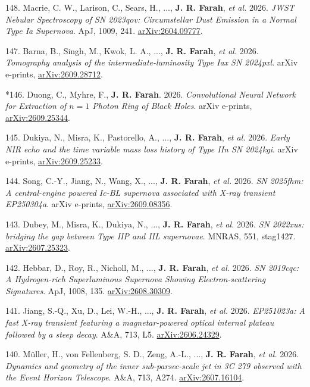 \documentclass[margin,line]{res}
\newcommand{\apj}{ApJ}                    %
\newcommand{\aap}{A\&A}                   %
\newcommand{\mnras}{MNRAS}                %
\begin{document}
\begin{resume}
148. Macrie, C. W., Larison, C., Sears, H., ..., \textbf{J. R. Farah}, \textit{et al.} 2026. \textit{JWST Nebular Spectroscopy of SN 2023qov: Circumstellar Dust Emission in a Normal Type Ia Supernova}. \apj, 1009, 241. \href{https://arxiv.org/abs/2604.09777}{arXiv:2604.09777}.

147. Barna, B., Singh, M., Kwok, L. A., ..., \textbf{J. R. Farah}, \textit{et al.} 2026. \textit{Tomography analysis of the intermediate-luminosity Type Iax SN 2024pxl}. arXiv e-prints, \href{https://arxiv.org/abs/2609.28712}{arXiv:2609.28712}.

\begin{mdframed}[linecolor=red]*146. Duong, C., Myhre, F., \textbf{J. R. Farah}. 2026. \textit{Convolutional Neural Network for Extraction of $n = 1$ Photon Ring of Black Holes}. arXiv e-prints, \href{https://arxiv.org/abs/2609.25344}{arXiv:2609.25344}.\end{mdframed}

145. Dukiya, N., Misra, K., Pastorello, A., ..., \textbf{J. R. Farah}, \textit{et al.} 2026. \textit{Early NIR echo and the time variable mass loss history of Type IIn SN 2024kgi}. arXiv e-prints, \href{https://arxiv.org/abs/2609.25233}{arXiv:2609.25233}.

144. Song, C.-Y., Jiang, N., Wang, X., ..., \textbf{J. R. Farah}, \textit{et al.} 2026. \textit{SN 2025fhm: A central-engine powered Ic-BL supernova associated with X-ray transient EP250304a}. arXiv e-prints, \href{https://arxiv.org/abs/2609.08356}{arXiv:2609.08356}.

143. Dubey, M., Misra, K., Dukiya, N., ..., \textbf{J. R. Farah}, \textit{et al.} 2026. \textit{SN 2022xus: bridging the gap between Type IIP and IIL supernovae}. \mnras, 551, stag1427. \href{https://arxiv.org/abs/2607.25323}{arXiv:2607.25323}.

142. Hebbar, D., Roy, R., Nicholl, M., ..., \textbf{J. R. Farah}, \textit{et al.} 2026. \textit{SN 2019cqc: A Hydrogen-rich Superluminous Supernova Showing Electron-scattering Signatures}. \apj, 1008, 135. \href{https://arxiv.org/abs/2608.30309}{arXiv:2608.30309}.

141. Jiang, S.-Q., Xu, D., Lei, W.-H., ..., \textbf{J. R. Farah}, \textit{et al.} 2026. \textit{EP251023a: A fast X-ray transient featuring a magnetar-powered optical internal plateau followed by a steep decay}. \aap, 713, L5. \href{https://arxiv.org/abs/2606.24329}{arXiv:2606.24329}.

140. M{\"u}ller, H., von Fellenberg, S. D., Zeng, A.-L., ..., \textbf{J. R. Farah}, \textit{et al.} 2026. \textit{Dynamics and geometry of the inner sub-parsec-scale jet in 3C 279 observed with the Event Horizon Telescope}. \aap, 713, A274. \href{https://arxiv.org/abs/2607.16104}{arXiv:2607.16104}.


\end{resume}
\end{document}
